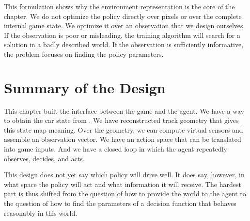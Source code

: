 This formulation shows why the environment representation is the core of the chapter. We do not optimize the policy directly over pixels or over the complete internal game state. We optimize it over an observation that we design ourselves. If the observation is poor or misleading, the training algorithm will search for a solution in a badly described world. If the observation is sufficiently informative, the problem focuses on finding the policy parameters.

\section{Summary of the Design}

This chapter built the interface between the game and the agent. We have a way to obtain the car state from \Trackmania{}. We have reconstructed track geometry that gives this state map meaning. Over the geometry, we can compute virtual sensors and assemble an observation vector. We have an action space that can be translated into game inputs. And we have a closed loop in which the agent repeatedly observes, decides, and acts.

This design does not yet say which policy will drive well. It does say, however, in what space the policy will act and what information it will receive. The hardest part is thus shifted from the question of how to provide the world to the agent to the question of how to find the parameters of a decision function that behaves reasonably in this world.
